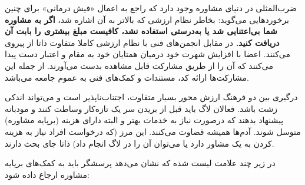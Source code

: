 ضرب‌المثلی در دنیای مشاوره وجود دارد که راجع به اعمال «فیش درمانی»
برای چنین برخورد‌هایی می‌گوید: بخاطر نظام ارزشی که بالاتر به آن اشاره شد،
{\bfseries
اگر به مشاوره شما بی‌اعتنایی شد یا به‌درستی استفاده نشد، کافیست
مبلغ بیشتری را بابت آن دریافت کنید.
}
در مقابل انجمن‌های فنی با نظام ارزشی کاملا متفاوت
ذاتا از
پیروی می‌کنند.
اعضا با افزایش شهرت خود درمیان همتایان خود به مقام و اعتبار
دست پیدا می‌کنند که آن را از طریق مشارکت قابل مشاهده بدست می‌آورند.
از جمله این مشارکت‌ها ارائه کد، مستندات و کمک‌های فنی به عموم جامعه می‌باشد.

درگیری بین دو فرهنگ ارزش محور بسیار متفاوت، اجتناب‌ناپذیر است
و می‌تواند اندکی زشت باشد.
فعالان لاگ باید قبل از بریدن سر یک تازه‌کار وساطت کنند
و مودبانه پیشنهاد بدهند که درصورت نیاز به خدمات بهتر
و البته دارای هزینه (برپایه مشاوره) متوسل شوند.
آدم‌ها همیشه قضاوت می‌کنند. این مرز (که درخواست افراد
نیاز به هزینه کردن به یک مشاور دارد یا می‌توان آن را در
لاگ انجام داد) ذاتا جای بحث دارند.

در زیر چند علامت لیست شده که نشان می‌دهد پرسشگر باید به
کمک‌های برپایه مشاوره ارجاع داده شود:

